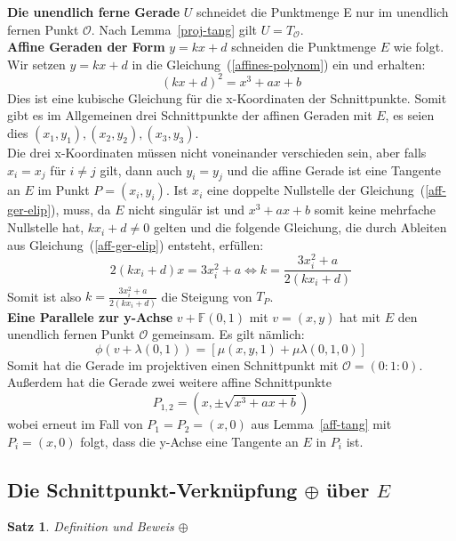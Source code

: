 \documentclass[hidelinks]{article}
\theoremstyle{plain}
\newtheorem{thm}{Satz}[section]
\theoremstyle{definition}
\theoremstyle{rem}
\newcommand{\patinf}{\mathcal{O}}
\begin{document}
\begin{sloppypar}
\textbf{Die unendlich ferne Gerade} $U$ schneidet die Punktmenge E nur im unendlich fernen Punkt $\patinf$. Nach Lemma~\ref{proj-tang} gilt $U=T_{\patinf}$.\\

\textbf{Affine Geraden der Form} $y=kx+d$ schneiden die Punktmenge $E$ wie folgt. Wir setzen $y=kx+d$ in die Gleichung~(\ref{affines-polynom}) ein und erhalten:
\begin{equation}\label{aff-ger-elip}
	(kx+d)^2=x^3+ax+b
\end{equation}
Dies ist eine kubische Gleichung für die x-Koordinaten der Schnittpunkte. Somit gibt es im Allgemeinen drei Schnittpunkte der affinen Geraden mit $E$, es seien dies $(x_1,y_1),(x_2,y_2),(x_3,y_3)$.\\
Die drei x-Koordinaten müssen nicht voneinander verschieden sein, aber falls $x_i=x_j$ für $i\ne j$ gilt, dann auch $y_i=y_j$ und die affine Gerade ist eine Tangente an $E$ im Punkt $P=(x_i,y_i)$.
Ist $x_i$ eine doppelte Nullstelle der Gleichung~(\ref{aff-ger-elip}), muss, da $E$ nicht singulär ist und $x^3+ax+b$ somit keine mehrfache Nullstelle hat, $kx_i+d\ne 0$ gelten und die folgende Gleichung, die durch Ableiten aus Gleichung~(\ref{aff-ger-elip}) entsteht, erfüllen:
\begin{equation*}
	2(kx_i+d)x=3x_i^2+a \Leftrightarrow k=\frac{3x_i^2+a}{2(kx_i+d)}
\end{equation*}
Somit ist also $k=\frac{3x_i^2+a}{2(kx_i+d)}$ die Steigung von $T_P$.\\

\textbf{Eine Parallele zur y-Achse} $v+\mathbb{F}(0,1)$ mit $v=(x,y)$ hat mit $E$ den unendlich fernen Punkt $\patinf$ gemeinsam. Es gilt nämlich:
\begin{equation*}
	\phi(v+\lambda(0,1))=[\mu(x,y,1)+\mu\lambda(0,1,0)]
\end{equation*}
Somit hat die Gerade im projektiven einen Schnittpunkt mit $\patinf=(0:1:0)$.\\
Außerdem hat die Gerade zwei weitere affine Schnittpunkte
\begin{equation*} 
	P_{1,2}=(x,\pm \sqrt{x^3+ax+b})
\end{equation*}
wobei erneut im Fall von $P_1=P_2=(x,0)$ aus Lemma~\ref{aff-tang} mit $P_i=(x,0)$ folgt, dass die y-Achse eine Tangente an $E$ in $P_i$ ist.

\subsection{Die Schnittpunkt-Verknüpfung $\oplus $ über $E$}\label{schnittpunkt-verkn}
\begin{thm} \label{oplus-op}
    Definition und Beweis $\oplus$
\end{thm}

\end{sloppypar}
\end{document}
